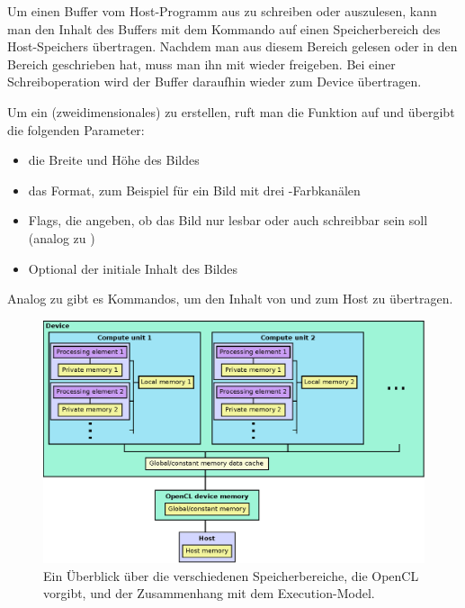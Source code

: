 Um einen Buffer vom Host-Programm aus zu schreiben oder auszulesen,
kann man den Inhalt des Buffers mit dem Kommando
 auf einen Speicherbereich des
Host-Speichers übertragen. Nachdem man aus diesem Bereich gelesen oder
in den Bereich geschrieben hat, muss man ihn mit
 wieder freigeben. Bei einer
Schreiboperation wird der Buffer daraufhin wieder zum Device übertragen.

Um ein (zweidimensionales)  zu erstellen, ruft man die Funktion
 auf und übergibt die folgenden Parameter:

\begin{itemize}
\item die Breite und Höhe des Bildes
\item das Format, zum Beispiel  für ein Bild mit drei -Farbkanälen
\item Flags, die angeben, ob das Bild nur lesbar oder auch schreibbar sein soll (analog zu )
\item Optional der initiale Inhalt des Bildes
\end{itemize}

Analog zu  gibt es Kommandos, um den Inhalt von und zum Host zu übertragen.

\begin{figure}[ht]
\centering
\includegraphics[width=15cm]{images/opencl_memory_model}
\caption{Ein Überblick über die verschiedenen Speicherbereiche, die OpenCL vorgibt, und der Zusammenhang mit dem Execution-Model.}
\label{fig:opencl_memory_model}
\end{figure}

